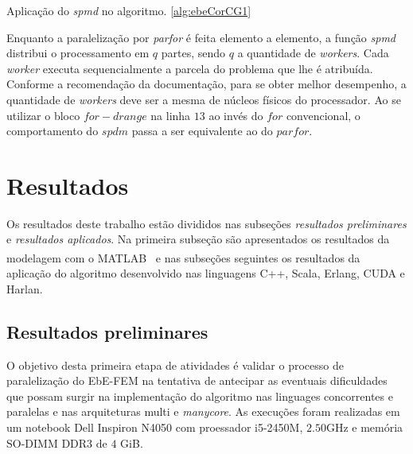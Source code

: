 \documentclass[
    12pt,               %
    openright,          %
    oneside,
    a4paper,            %
    english,            %
    french,             %
    spanish,            %
    brazil              %
    ]{abntex2}
\newcommand{\matlab}{MATLAB\textsuperscript{\textregistered} \ }
\begin{document}
\begin{algorithm}	
	\caption{\label{alg:ebeSpmdCG1}Aplicação do \textit{spmd} no algoritmo. \ref{alg:ebeCorCG1}} 
	\begin{algorithmic}[1]

		\EndFor
		\EndFor
		\EndFor
	\end{algorithmic}
\end{algorithm}

Enquanto a paralelização por \textit{parfor} é feita elemento a elemento, a função \textit{spmd} distribui o processamento em $q$ partes, sendo $q$ a quantidade de \textit{workers}. Cada \textit{worker} executa sequencialmente a parcela do problema que lhe é atribuída. Conforme a recomendação da documentação, para se obter melhor desempenho, a quantidade de \textit{workers} deve ser a mesma de núcleos físicos do processador. Ao se utilizar o bloco $for-drange$ na linha $13$ ao invés do $for$ convencional, o comportamento do $spdm$ passa a ser equivalente ao do $parfor$.


\section{Resultados}
Os resultados deste trabalho estão divididos nas subseções \textit{resultados preliminares} e \textit{resultados aplicados}. Na primeira subseção são apresentados os resultados da modelagem com o \matlab e nas subseções seguintes os resultados da aplicação do algoritmo desenvolvido nas linguagens C++, Scala, Erlang, CUDA e Harlan.

\subsection{Resultados preliminares}
O objetivo desta primeira etapa de atividades é validar o processo de paralelização do EbE-FEM na tentativa de antecipar as eventuais dificuldades que possam surgir na implementação do algoritmo nas linguages concorrentes e paralelas e nas arquiteturas multi e \textit{manycore}. 
As execuções foram realizadas em um notebook Dell Inspiron N4050 com proessador i5-2450M, $2.50$GHz e memória SO-DIMM DDR3 de $4$ GiB.
\end{document}
